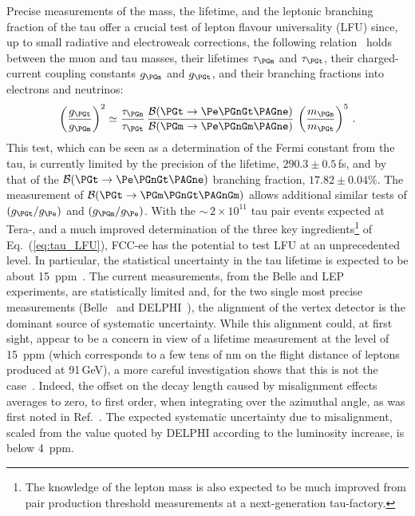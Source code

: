 Precise measurements of the mass, the lifetime, and the leptonic branching fraction of the tau offer a crucial test of lepton flavour universality (LFU) since, 
up to small radiative and electroweak corrections, 
the following relation~\cite{Pich:2013lsa,CLEO:1996oro} holds between the muon and tau masses, 
their lifetimes $\tau_{\PGm}$ and $\tau_{\PGt}$, 
their charged-current coupling constants $g_{\PGm}$ and $g_{\PGt}$, 
and their branching fractions into electrons and neutrinos:
\begin{equation}
\left(\frac{g_{\PGt}}{g_{\PGm}}\right)^2 \simeq 
\frac{\tau_{\PGm}}{\tau_{\PGt}} \, \frac{{\cal{B}}(\PGt \to \Pe\PGnGt\PAGne) }{{\cal{B}}(\PGm \to \Pe\PGnGm\PAGne) }\, \left( \frac{m_{\PGm}}{m_{\PGt}} \right)^5 \, . 
\label{eq:tau_LFU}
\end{equation}
This test, which can be seen as a determination of the Fermi constant from the tau, 
is currently limited by the precision of the \PGt lifetime, $290.3 \pm 0.5$\,fs, 
and by that of the $\cal{B}(\PGt \to \Pe \PGnGt \PAGne)$ branching fraction, $17.82 \pm 0.04 \%$. 
The measurement of $\cal{B}(\PGt \to \PGm \PGnGt \PAGnGm)$ allows additional similar tests of $(g_{\PGt} / g_{\Pe})$ and $(g_{\PGm} / g_{\Pe})$.
With the $\sim$\,$2 \times 10^{11}$ tau pair events expected at Tera-\PZ, and a much improved determination of the three key 
ingredients\footnote{The knowledge of the \PGt lepton mass is also expected to be much improved from pair production threshold measurements at a next-generation tau-factory.} 
of Eq.~(\ref{eq:tau_LFU}), FCC-ee has the potential to test LFU at an unprecedented level. 
In particular, the statistical uncertainty in the tau lifetime is expected to be about 15~ppm~\cite{Lusiani:2024tau}. 
The current measurements, from the Belle and LEP experiments, are statistically limited and, 
for the two single most precise measurements (Belle~\cite{Belle:2013teo} and DELPHI~\cite{DELPHI:2003zcz}), 
the alignment of the vertex detector is the dominant source of systematic uncertainty. 
While this alignment could, at first sight, appear to be a concern in view of a lifetime measurement at the level of 15~ppm  
(which corresponds to a few tens of nm on the flight distance of \PGt leptons produced at 91\,GeV), 
a more careful investigation shows that this is not the case~\cite{Lusiani:2024tau}.
Indeed, the offset on the decay length caused by misalignment effects averages to zero, to first order, 
when integrating over the azimuthal angle, as was first noted in Ref.~\cite{Wasserbaech:1998ur}. 
The expected systematic uncertainty due to misalignment, scaled from the value quoted by DELPHI according to the luminosity increase, is below 4~ppm. 
